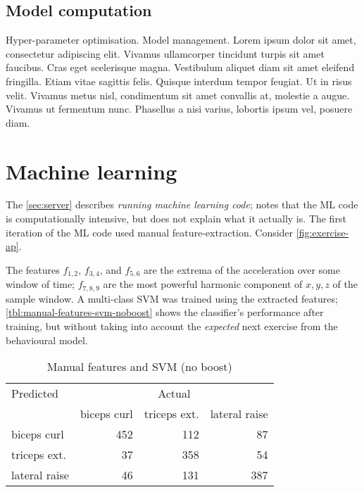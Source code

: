 \subsection{Model computation}\label{sec:model-computation}
Hyper-parameter optimisation. Model management. Lorem ipsum dolor sit amet, consectetur adipiscing elit. Vivamus ullamcorper tincidunt turpis sit amet faucibus. Cras eget scelerisque magna. Vestibulum aliquet diam sit amet eleifend fringilla. Etiam vitae sagittis felis. Quisque interdum tempor feugiat. Ut in risus velit. Vivamus metus nisl, condimentum sit amet convallis at, molestie a augue. Vivamus ut fermentum nunc. Phasellus a nisi varius, lobortis ipsum vel, posuere diam.

\section{Machine learning}
The \autoref{sec:server} describes \emph{running machine learning code}; notes that the ML code is computationally intensive, but does not explain what it actually is. The first iteration of the ML code used manual feature-extraction. Consider \autoref{fig:exercise-ap}.


The features $f_{1,2}$, $f_{3,4}$, and $f_{5,6}$ are the extrema of the acceleration over some window of time; $f_{7,8,9}$ are the most powerful harmonic component of $x, y, z$ of the sample window. A multi-class SVM was trained using the extracted features; \autoref{tbl:manual-features-svm-noboost} shows the classifier's performance after training, but without taking into account the \emph{expected} next exercise from the behavioural model.

\begin{table}[h]
    \begin{tabular}{lrrr}
        \toprule
        Predicted         & \multicolumn{3}{c}{Actual} \\
        \cmidrule(r){2-4} & biceps curl & triceps ext. & lateral raise \\
        \midrule
        biceps curl       & 452         & 112          & 87 \\ 
        triceps ext.      & 37          & 358          & 54 \\
        lateral raise     & 46          & 131          & 387 \\
        \bottomrule
    \end{tabular}
    \caption{Manual features and SVM (no boost)}
    \label{tbl:manual-features-svm-noboost}
\end{table}

